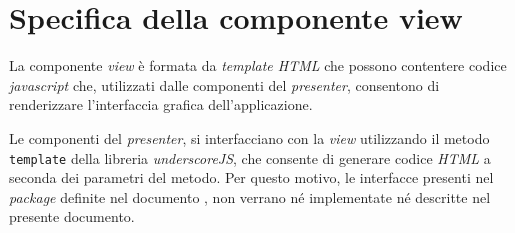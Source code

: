 \section{Specifica della componente view}

La componente \textit{view} è formata da \textit{template HTML} che possono contentere codice \textit{javascript} che, utilizzati dalle componenti del \textit{presenter}, consentono di renderizzare l'interfaccia grafica dell'applicazione.

Le componenti del \textit{presenter}, si interfacciano con la \textit{view} utilizzando il metodo \texttt{template} della libreria \textit{underscoreJS}, che consente di generare codice \textit{HTML} a seconda dei parametri del metodo.
Per questo motivo, le interfacce presenti nel \textit{package} \view{} definite nel documento \SpecificaTecnica{}, non verrano né implementate né descritte nel presente documento.

